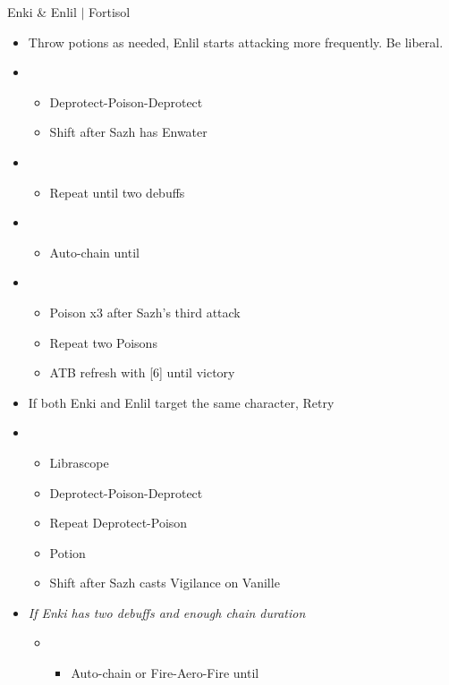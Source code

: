 \begin{battle}{Enki \& Enlil $|$ Fortisol}
\begin{multicols}{2}
\begin{itemize}
\begin{itemize}
    \end{itemize}
    \item Throw potions as needed, Enlil starts attacking more frequently. Be liberal.
    \item \third
    \begin{itemize}
        \item Deprotect-Poison-Deprotect
        \item Shift after Sazh has Enwater
    \end{itemize}
    \item \fifth
    \begin{itemize}
        \item Repeat until two debuffs
    \end{itemize}
    \item \fourth
    \begin{itemize}
        \item Auto-chain until \stagger
    \end{itemize}
    \item \second
    \begin{itemize}
        \item Poison x3 after Sazh's third attack
        \item Repeat two Poisons
        \item ATB refresh with [6] until victory
    \end{itemize}
\end{itemize}
\columnbreak    
\begin{itemize}
    \item If both Enki and Enlil target the same character, Retry
    \item \third
    \begin{itemize}
        \item Librascope
        \item Deprotect-Poison-Deprotect
        \item Repeat Deprotect-Poison
        \item Potion
        \item Shift after Sazh casts Vigilance on Vanille
    \end{itemize}
    \item \textit{If Enki has two debuffs and enough chain duration}
    \begin{itemize}
        \item \fourth
        \begin{itemize}
            \item Auto-chain or Fire-Aero-Fire until \stagger

\end{itemize}
\end{itemize}
\end{itemize}
\end{multicols}
\end{battle}
